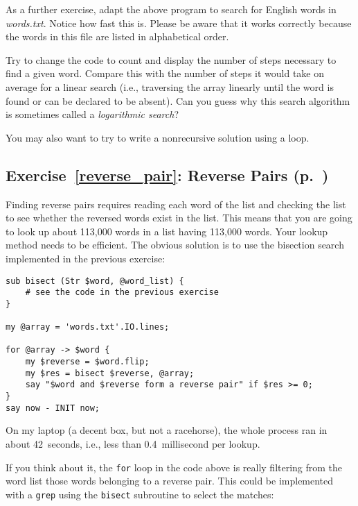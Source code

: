 As a further exercise, adapt the above program to 
search for English words in \emph{words.txt}. Notice 
how fast this is. Please 
be aware that it works correctly because the words 
in this file are listed in alphabetical order.

Try to change 
the code to count and display the number of steps 
necessary to find a given word. Compare this with the number 
of steps it would take on average for a linear search 
(i.e., traversing the array linearly until the word 
is found or can be declared to be absent). Can you 
guess why this search algorithm is sometimes 
called a \emph{logarithmic search}?

You may also want to try to write a nonrecursive solution 
using a loop.


\subsection{Exercise~\ref{reverse_pair}: Reverse Pairs (p.~\pageref{reverse_pair})}
\label{sol_reverse_pair}

Finding reverse pairs requires reading each word of 
the list and checking the list to see whether the reversed 
words exist in the list. This means that you are 
going to look up about 113,000 words in a list having 
113,000 words. Your lookup method needs to be efficient.
The obvious solution is to use the bisection search 
implemented in the previous exercise:

\begin{verbatim}
sub bisect (Str $word, @word_list) {
    # see the code in the previous exercise
}

my @array = 'words.txt'.IO.lines;

for @array -> $word {
    my $reverse = $word.flip;
    my $res = bisect $reverse, @array;
    say "$word and $reverse form a reverse pair" if $res >= 0;
}
say now - INIT now;
\end{verbatim}

On my laptop (a decent box, but not a racehorse), 
the whole process ran in about 42~seconds, i.e., 
less than 0.4~millisecond per lookup.

If you think about it, the {\tt for} loop in the code 
above is really filtering from the word list those words 
belonging to a reverse pair. This could be implemented 
with a {\tt grep} using the {\tt bisect} subroutine to 
select the matches:

